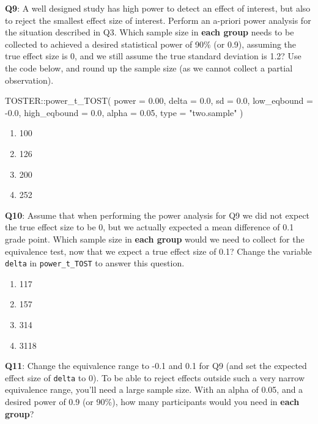 \documentclass[
  oneside]{krantz}
\makeatletter
\newenvironment{Shaded}{\begin{snugshade}}{\end{snugshade}}
\newcommand{\AttributeTok}[1]{\textcolor[rgb]{0.61,0.61,0.61}{#1}}
\newcommand{\FloatTok}[1]{\textcolor[rgb]{0.06,0.06,0.06}{#1}}
\newcommand{\FunctionTok}[1]{\textcolor[rgb]{0,0,0}{#1}}
\newcommand{\NormalTok}[1]{#1}
\newcommand{\SpecialCharTok}[1]{\textcolor[rgb]{0,0,0}{#1}}
\newcommand{\StringTok}[1]{\textcolor[rgb]{0.5,0.5,0.5}{#1}}
\providecommand{\tightlist}{%
  \setlength{\itemsep}{0pt}\setlength{\parskip}{0pt}}
\newenvironment{kframe}{%
\medskip{}
\setlength{\fboxsep}{.8em}
 \def\at@end@of@kframe{}%
 \ifinner\ifhmode%
  \def\at@end@of@kframe{\end{minipage}}%
  \begin{minipage}{\columnwidth}%
 \fi\fi%
 \def\FrameCommand##1{\hskip\@totalleftmargin \hskip-\fboxsep
 \colorbox{shadecolor}{##1}\hskip-\fboxsep
     \hskip-\linewidth \hskip-\@totalleftmargin \hskip\columnwidth}%
 \MakeFramed {\advance\hsize-\width
   \@totalleftmargin\z@ \linewidth\hsize
   \@setminipage}}%
 {\par\unskip\endMakeFramed%
 \at@end@of@kframe}
\renewenvironment{Shaded}{\begin{kframe}}{\end{kframe}}
\makeatother
\begin{document}
\textbf{Q9}: A well designed study has high power to detect an effect of interest, but also to reject the smallest effect size of interest. Perform an a-priori power analysis for the situation described in Q3. Which sample size in \textbf{each group} needs to be collected to achieved a desired statistical power of 90\% (or 0.9), assuming the true effect size is 0, and we still assume the true standard deviation is 1.2? Use the code below, and round up the sample size (as we cannot collect a partial observation).

\begin{Shaded}
\begin{Highlighting}[]
\NormalTok{TOSTER}\SpecialCharTok{::}\FunctionTok{power\_t\_TOST}\NormalTok{(}
  \AttributeTok{power =} \FloatTok{0.00}\NormalTok{,}
  \AttributeTok{delta =} \FloatTok{0.0}\NormalTok{,}
  \AttributeTok{sd =} \FloatTok{0.0}\NormalTok{,}
  \AttributeTok{low\_eqbound =} \SpecialCharTok{{-}}\FloatTok{0.0}\NormalTok{,}
  \AttributeTok{high\_eqbound =} \FloatTok{0.0}\NormalTok{,}
  \AttributeTok{alpha =} \FloatTok{0.05}\NormalTok{,}
  \AttributeTok{type =} \StringTok{"two.sample"}
\NormalTok{)}
\end{Highlighting}
\end{Shaded}

\begin{enumerate}
\def\labelenumi{\Alph{enumi})}
\tightlist
\item
  100
\item
  126
\item
  200
\item
  252
\end{enumerate}

\textbf{Q10}: Assume that when performing the power analysis for Q9 we did not expect the true effect size to be 0, but we actually expected a mean difference of 0.1 grade point. Which sample size in \textbf{each group} would we need to collect for the equivalence test, now that we expect a true effect size of 0.1? Change the variable \texttt{delta} in \texttt{power\_t\_TOST} to answer this question.

\begin{enumerate}
\def\labelenumi{\Alph{enumi})}
\tightlist
\item
  117
\item
  157
\item
  314
\item
  3118
\end{enumerate}

\textbf{Q11}: Change the equivalence range to -0.1 and 0.1 for Q9 (and set the expected effect size of \texttt{delta} to 0). To be able to reject effects outside such a very narrow equivalence range, you'll need a large sample size. With an alpha of 0.05, and a desired power of 0.9 (or 90\%), how many participants would you need in \textbf{each group}?
\end{document}
